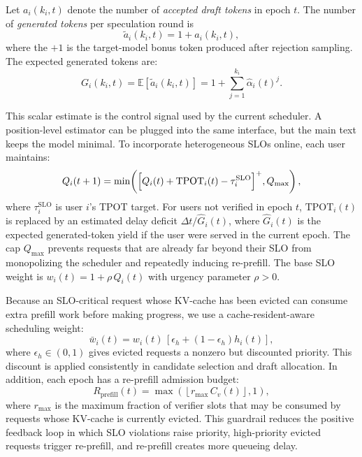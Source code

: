 \documentclass[journal]{IEEEtran}
\begin{document}
Let $a_i(k_i,t)$ denote the number of \emph{accepted draft 
tokens} in epoch $t$. The number of 
\emph{generated tokens} per speculation round is
\begin{equation}
    \label{eq:generated-tokens}
    \tilde{a}_i(k_i,t) = 1 + a_i(k_i,t),
\end{equation}
where the \emph{$+1$} is the target-model bonus token produced 
after rejection sampling. The expected generated tokens are:
\begin{equation}
    \label{eq:Gi}
    G_i(k_i, t) = \mathbb{E}[\tilde{a}_i(k_i,t)] 
    = 1 + \sum_{j=1}^{k_i} 
    \hat{\alpha}_{i}(t)^j.
\end{equation}

This scalar estimate is the control signal used by the current
scheduler. A position-level estimator can be plugged into the same
interface, but the main text keeps the model minimal.
To incorporate heterogeneous SLOs online, each user 
maintains:
\begin{equation}
    \label{eq:virtual-queue}
    Q_i(t+1) = \min\!\left(
    \Bigl[ Q_i(t) + 
    \text{TPOT}_i(t) - \tau_i^{\text{SLO}} \Bigr]^+,
    Q_{\max}\right),
\end{equation}
where $\tau_i^{\text{SLO}}$ is user $i$'s TPOT target. 
For users not verified in epoch $t$, $\text{TPOT}_i(t)$ is 
replaced by an estimated delay deficit 
$\Delta t/\widehat{G}_i(t)$, where 
$\widehat{G}_i(t)$ is the expected generated-token yield if 
the user were served in the current epoch. The cap $Q_{\max}$ 
prevents requests that are already far beyond their SLO from 
monopolizing the scheduler and repeatedly inducing re-prefill. 
The base SLO weight is $w_i(t) = 1 + \rho \, Q_i(t)$ with 
urgency parameter $\rho > 0$.

Because an SLO-critical request whose KV-cache has been evicted 
can consume extra prefill work before making progress, we 
use a cache-resident-aware scheduling weight:
\begin{equation}
    \label{eq:resident-weight}
    \bar{w}_i(t) =
    w_i(t)\,[\epsilon_h+(1-\epsilon_h)h_i(t)],
\end{equation}
where $\epsilon_h \in (0,1)$ gives evicted requests a nonzero 
but discounted priority. This discount is applied consistently 
in candidate selection and draft allocation. In addition, each 
epoch has a re-prefill admission budget:
\begin{equation}
    \label{eq:reprefill-budget}
    R_{\text{prefill}}(t) =
    \max\!\left(\left\lfloor r_{\max}\, C_v(t) \right\rfloor, 1\right),
\end{equation}
where $r_{\max}$ is the maximum fraction of verifier slots that 
may be consumed by requests whose KV-cache is currently evicted. 
This guardrail reduces the positive feedback loop in which SLO 
violations raise priority, high-priority evicted requests trigger 
re-prefill, and re-prefill creates more queueing delay.
\end{document}

